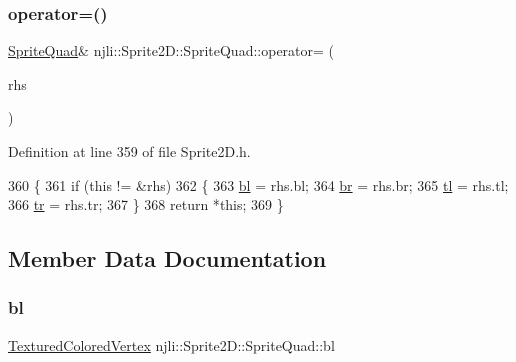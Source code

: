\subsubsection{\texorpdfstring{operator=()}{operator=()}}
{\footnotesize\ttfamily \mbox{\hyperlink{classnjli_1_1_sprite2_d_1_1_sprite_quad}{Sprite\+Quad}}\& njli\+::\+Sprite2\+D\+::\+Sprite\+Quad\+::operator= (\begin{DoxyParamCaption}\item[{const \mbox{\hyperlink{classnjli_1_1_sprite2_d_1_1_sprite_quad}{Sprite\+Quad}} \&}]{rhs }\end{DoxyParamCaption})\hspace{0.3cm}{\ttfamily [inline]}}



Definition at line 359 of file Sprite2\+D.\+h.


\begin{DoxyCode}
360       \{
361         \textcolor{keywordflow}{if} (\textcolor{keyword}{this} != &rhs)
362           \{
363             \mbox{\hyperlink{classnjli_1_1_sprite2_d_1_1_sprite_quad_ae0ffef0622181dcc734b02cef8f45075}{bl}} = rhs.bl;
364             \mbox{\hyperlink{classnjli_1_1_sprite2_d_1_1_sprite_quad_aa7033cec9b83bad9dfcadb89f29dcf94}{br}} = rhs.br;
365             \mbox{\hyperlink{classnjli_1_1_sprite2_d_1_1_sprite_quad_aecfbaa6fa13750f9fa1347cf36d12f7e}{tl}} = rhs.tl;
366             \mbox{\hyperlink{classnjli_1_1_sprite2_d_1_1_sprite_quad_a0eb387285104214c4b47b616a923d48d}{tr}} = rhs.tr;
367           \}
368         \textcolor{keywordflow}{return} *\textcolor{keyword}{this};
369       \}
\end{DoxyCode}


\subsection{Member Data Documentation}
\mbox{\label{classnjli_1_1_sprite2_d_1_1_sprite_quad_ae0ffef0622181dcc734b02cef8f45075}} 
\subsubsection{\texorpdfstring{bl}{bl}}
{\footnotesize\ttfamily \mbox{\hyperlink{structnjli_1_1_geometry_1_1_textured_colored_vertex}{Textured\+Colored\+Vertex}} njli\+::\+Sprite2\+D\+::\+Sprite\+Quad\+::bl}




